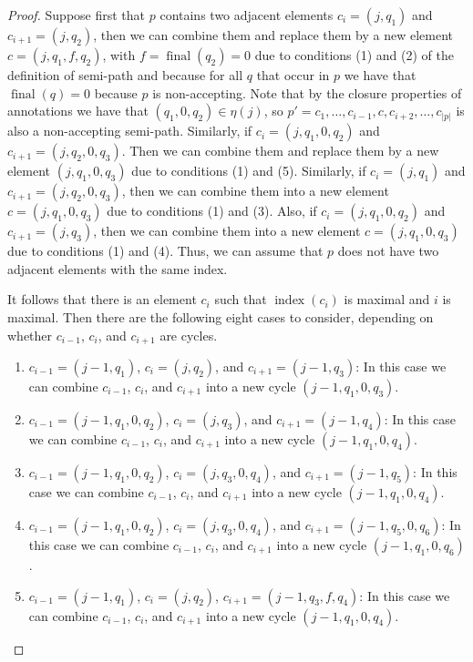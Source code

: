 \documentclass{lmcs}
\theoremstyle{definition}
\DeclareMathOperator{\?}{?}
\DeclareMathOperator{\final}{final}
\DeclareMathOperator{\myindex}{index}
\begin{document}
\begin{proof}
Suppose first that $p$ contains two adjacent elements $c_i=(j,q_1)$ and $c_{i+1}=(j,q_2)$, then we can combine them and replace them by a new element $c=(j,q_1,f,q_2)$, with $f=\final(q_2) = 0$ due to conditions (1) and (2) of the definition of semi-path and because for all $q$ that occur in $p$ we have that $\final(q) = 0$ because $p$ is non-accepting.  Note that by the closure properties of annotations we have that $(q_1,0,q_2)\in\eta(j)$, so $p'=c_1,\ldots,c_{i-1},c,c_{i+2},\ldots,c_{|p|}$ is also a non-accepting semi-path. Similarly, if $c_i=(j,q_1,0,q_2)$ and $c_{i+1}=(j,q_2,0,q_3)$. Then we can combine them and replace them by a new element $(j,q_1,0,q_3)$ due to conditions (1) and (5). Similarly, if $c_i = (j,q_1)$ and $c_{i+1} = (j,q_2,0,q_3)$, then  we can combine them into a new element $c=(j,q_1,0,q_3)$ due to conditions (1) and (3). Also, if $c_i = (j,q_1,0,q_2)$ and $c_{i+1} = (j,q_3)$,  then  we can combine them into a new element $c=(j,q_1,0,q_3)$ due to conditions (1) and (4). Thus, we can assume that $p$ does not have two adjacent elements with the same index.

It follows that there is an element $c_i$ such that $\myindex(c_i)$ is maximal and $i$ is maximal. Then there are the following eight cases to consider, depending on whether $c_{i-1}$, $c_i$, and $c_{i+1}$ are cycles.
\begin{enumerate}
\item
$c_{i-1}=(j-1,q_1)$, $c_i=(j,q_2)$, and $c_{i+1}=(j-1,q_3)$: In this case we can combine $c_{i-1}$, $c_i$, and $c_{i+1}$ into a new cycle $(j-1,q_1,0,q_3)$.

\item
$c_{i-1}=(j-1,q_1,0,q_2)$, $c_i=(j,q_3)$, and $c_{i+1}=(j-1,q_4)$: In this case we can combine $c_{i-1}$, $c_i$, and $c_{i+1}$ into a new cycle $(j-1,q_1,0,q_4)$.

\item
$c_{i-1}=(j-1,q_1,0,q_2)$, $c_i=(j,q_3,0,q_4)$, and $c_{i+1}=(j-1,q_5)$: In this case we can combine $c_{i-1}$, $c_i$, and $c_{i+1}$ into a new cycle $(j-1,q_1,0,q_4)$.

\item
$c_{i-1}=(j-1,q_1,0,q_2)$, $c_i=(j,q_3,0,q_4)$, and $c_{i+1}=(j-1,q_5,0,q_6)$: In this case we can combine $c_{i-1}$, $c_i$, and $c_{i+1}$ into a new cycle $(j-1,q_1,0,q_6)$.
\item
$c_{i-1}=(j-1,q_1)$, $c_i=(j,q_2)$, $c_{i+1} = (j-1,q_3,f,q_4)$: In this case we can combine $c_{i-1}$, $c_i$, and $c_{i+1}$ into a new cycle $(j-1,q_1,0,q_4)$.


\end{enumerate}
\end{proof}
\end{document}
